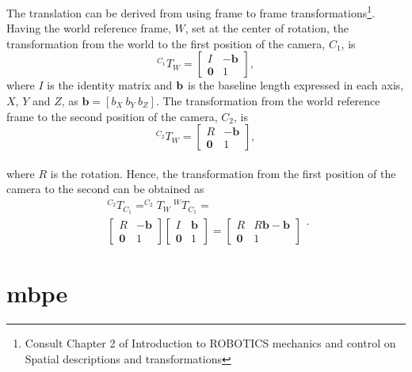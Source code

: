 The translation can be derived from using frame to frame transformations\footnote{Consult Chapter 2 of Introduction to ROBOTICS mechanics and control \cite{robotics} on Spatial descriptions and transformations}. Having the world reference frame, ${W}$, set at the center of rotation, the transformation from the world to the first position of the camera, ${C_1}$, is
\begin{equation}
^{C_1}T_{W} = \begin{bmatrix}
I & -\mathbf{b}\\ 
\mathbf{0} & 1
\end{bmatrix},
\end{equation}  
where $I$ is the identity matrix and $\bf b$ is the baseline length expressed in each axis, $X$, $Y$ and $Z$, as $\mathbf{b} = [b_X \ b_Y \ b_Z]$. 
The transformation from the world reference frame to the second position of the camera, ${C_2}$, is
\begin{equation}
^{C_2}T_{W} = \begin{bmatrix}
R & -\mathbf{b}\\ 
\mathbf{0} & 1
\end{bmatrix},
\end{equation}\\
where $R$ is the rotation.
Hence, the transformation from the first position of the camera to the second can be obtained as
\begin{equation}
\begin{split}
^{C_2}T_{C_1} = ^{C_2}T_W  \ ^WT_{C_1} =\\
\begin{bmatrix}
R & -\mathbf{b}\\ 
\mathbf{0} & 1
\end{bmatrix}
\begin{bmatrix}
I & \mathbf{b}\\ 
\mathbf{0} & 1
\end{bmatrix}
=
\begin{bmatrix}
R & R\mathbf{b}-\mathbf{b}\\ 
\mathbf{0} & 1
\end{bmatrix}
\end{split}.
\end{equation}

\section{\acrlong{mbpe}}
\label{MBaPE}

